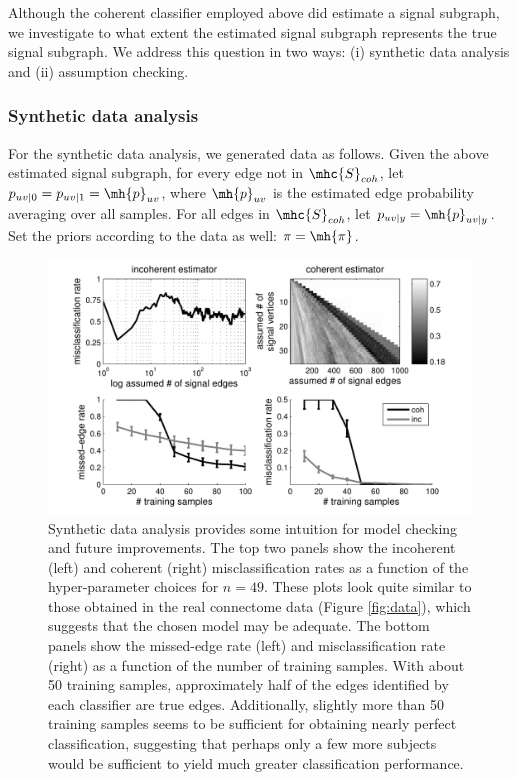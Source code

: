 \documentclass[10pt,journal,cspaper,compsoc]{IEEEtran}
\begin{document}
Although the coherent classifier employed above did estimate a signal subgraph, we investigate to what extent the estimated signal subgraph represents the true signal subgraph.  We address this question in two ways:  (i) synthetic data analysis and (ii) assumption checking.  

\subsubsection{Synthetic data analysis} %
\label{ssub:synthetic_data_analysis}

For the synthetic data analysis, we generated data as follows.  Given the above estimated signal subgraph, for every edge not in $\mhc{S}_{coh}$, let $p_{uv|0}=p_{uv|1}=\mh{p}_{uv}$, where $\mh{p}_{uv}$ is the estimated edge probability averaging over all samples.  For all edges in $\mhc{S}_{coh}$, let $p_{uv|y}=\mh{p}_{uv|y}$.  Set the priors according to the data as well: $\pi=\mh{\pi}$.  

\begin{figure}[tb!]
	\centering
		\includegraphics[width=0.7\linewidth]{../figs/BLSA0317_Count_synthetic_Lhats.pdf}
	\caption{Synthetic data analysis provides some intuition for model checking and future improvements.  The top two panels show the incoherent (left) and coherent (right) misclassification rates as a function of the hyper-parameter choices for $n=49$.  These plots look quite similar to those obtained in the real connectome data (Figure \ref{fig:data}), which suggests that the chosen model may be adequate.  The bottom panels show the missed-edge rate (left) and misclassification rate (right) as a function of the number of training samples.  With about 50 training samples, approximately half of the edges identified by each classifier are true edges.  Additionally, slightly more than 50 training samples seems to be sufficient for obtaining nearly perfect classification, suggesting that perhaps only a few more subjects would be sufficient to yield much greater classification performance.}
	\label{fig:synthetic}
\end{figure}
\end{document}
